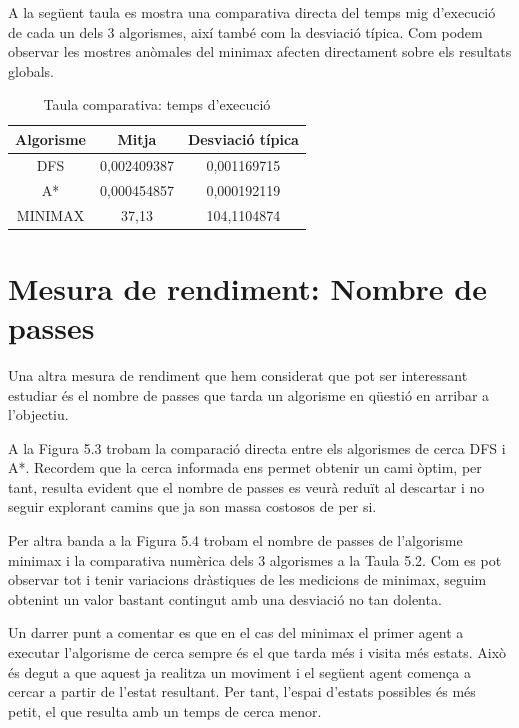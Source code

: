 \documentclass[12pt,a4paper]{report}
\begin{document}
\vspace*{0.5cm}
A la següent taula es mostra una comparativa directa del temps mig d'execució
de cada un dels 3 algorismes, així també com la desviació típica. Com podem
observar les mostres anòmales del minimax afecten directament sobre els 
resultats globals.
\vspace*{0.25cm}

\begin{table}[h!]
  \centering
  \begin{tabular}{|c|c|c|}
    \hline
    Algorisme & Mitja & Desviació típica \\
    \hline
    DFS & 0,002409387 & 0,001169715 \\
    A* & 0,000454857 & 0,000192119 \\
    MINIMAX & 37,13 & 104,1104874 \\
    \hline
  \end{tabular}
  \caption{Taula comparativa: temps d'execució}
\end{table}


\newpage
\vspace*{0.01cm}
\section{Mesura de rendiment: Nombre de passes}
Una altra mesura de rendiment que hem considerat que pot ser interessant
estudiar és el nombre de passes que tarda un algorisme en qüestió en
arribar a l'objectiu.

A la Figura 5.3 trobam la comparació directa entre els algorismes de cerca DFS i A*.
Recordem que la cerca informada ens permet obtenir un cami òptim, per tant,
resulta evident que el nombre de passes es veurà reduït al descartar i no 
seguir explorant camins que ja son massa costosos de per si.

Per altra banda a la Figura 5.4 trobam el nombre de passes de l'algorisme minimax
i la comparativa numèrica dels 3 algorismes a la Taula 5.2. Com es pot observar 
tot i tenir variacions dràstiques de les medicions de minimax, seguim obtenint
un valor bastant contingut amb una desviació no tan dolenta.

Un darrer punt a comentar es que en el cas del minimax el primer agent a executar l'algorisme de cerca
sempre és el que tarda més i visita més estats. Això és degut a que aquest ja realitza un moviment
i el següent agent comença a cercar a partir de l'estat resultant.
Per tant, l'espai d'estats possibles és més petit, el que resulta amb un temps de cerca menor.
\end{document}

